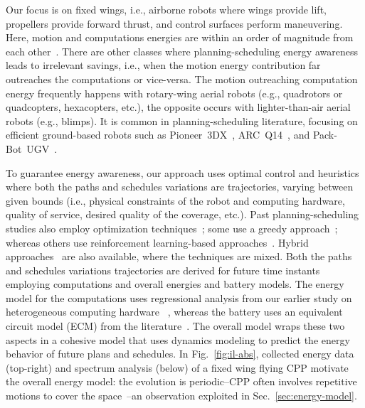 \documentclass[letterpaper,10pt,conference,twoside]{IEEEtran}
\theoremstyle{definition}
\newtheorem*{ctb}{Contribution}
\begin{document}
Our focus is on fixed wings, i.e., airborne robots where wings provide lift, propellers provide forward thrust, and control surfaces perform maneuvering. Here, motion and computations energies are within an order of magnitude from each other~\cite{seewald2020mechanical,zamanakos2020energy}. %
{\color{black}T}here are other classes where planning-scheduling energy awareness leads to irrelevant savings, i.e., when the motion energy contribution far outreaches the computations or vice-versa. The {\color{black}motion outreaching computation energy} frequently happens with rotary-wing aerial robots (e.g., quadrotors or quadcopters, hexacopters, etc.){\color{black}, the opposite occurs with} lighter-than-air aerial robots (e.g., blimps). It is %
common %
{\color{black}in} %
planning-scheduling literature, focusing on %
efficient ground-based robots such as Pioneer~3DX~\cite{ho2019qos,mei2005case}, ARC~Q14~\cite{ondruska2015scheduled,lahijanian2018resource}, and Pack-Bot~UGV~\cite{sadrpour2013mission}.

To guarantee energy awareness, our approach uses optimal control {\color{black} and heuristics} where both the paths and schedules variations are trajectories, varying between given bounds (i.e., physical constraints of the robot and computing hardware, quality of service, desired quality of the coverage, etc.). Past planning-scheduling studies also employ optimization techniques~\cite{brateman2006energy,zhang2007low,ondruska2015scheduled,lahijanian2018resource}; some use a greedy approach~\cite{mei2005case,sudhakar2020balancing,sadrpour2013mission}; whereas others use reinforcement learning-based approaches~\cite{ho2019qos,ho2018towards}. {\color{black}Hybrid approaches~\cite{ondruska2015scheduled} are also available, where the techniques are mixed.} Both the path{\color{black}s} and schedules variations trajectories are derived for future time instants employing computations and overall energies and battery models. The energy model for the computations uses regressional analysis from our earlier study on heterogeneous computing hardware%
~\cite{seewald2019coarse,seewald2019component}, whereas the battery uses an equivalent circuit model (ECM) from the literature~\cite{%
hinz2019comparison,mousavi2014various}. The overall model wraps these two aspects in a cohesive model that uses dynamics modeling to predict the energy behavior of future plans and schedules. In Fig.~\ref{fig:il-abs}, collected energy data ({\color{black}top-right}) and spectrum analysis ({\color{black}below}) of a fixed wing %
flying CPP motivate the overall energy model: the evolution is periodic--CPP often involves repetitive motions to cover the space~\cite{choset2001coverage,galceran2013survey}--an observation exploited in Sec.~\ref{sec:energy-model}.%
\end{document}
